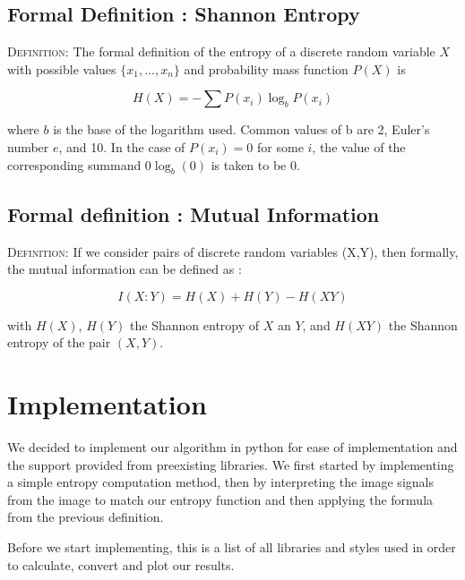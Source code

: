\documentclass{article}
\begin{document}
\subsection{Formal Definition : Shannon Entropy}
\vspace{2mm}
\begin{flushleft}
\vspace{2mm }
\begin{tcolorbox}
\textsc{Definition:}\cite{wiki-shannon}\newline\newline
The formal definition of the entropy of a discrete random variable $X$ with possible values $\{x_1, ... ,x_n\}$ and probability mass function $P(X)$ is
\vspace{4mm}
\begin{center}
\[
H(X) = - \sum{P(x_i)\log_b P(x_i)}
\]
\end{center}
\vspace{4mm}
where $b$ is the base of the logarithm used. Common values of b are 2, Euler's number $e$, and 10. In the case of $P(x_i) = 0$ for some $i$, the value of the corresponding summand $0\log_b (0)$ is taken to be 0.
\end{tcolorbox}
\end{flushleft}

\subsection{Formal definition : Mutual Information}
\vspace{2mm}
\begin{flushleft}
\vspace{2mm}
\begin{tcolorbox}
\textsc{Definition:}\cite{quantiki}\newline\newline
If we consider pairs of discrete random variables (X,Y), then formally, the mutual information can be defined as :
\begin{center}
\[
I(X : Y) = H(X) + H(Y) - H(XY)
\]
\end{center}
\vspace{2mm}
with $H(X)$, $H(Y)$ the Shannon entropy of $X$ an $Y$, and $H(XY)$ the Shannon entropy of the pair $(X, Y)$. 
\end{tcolorbox}
\end{flushleft}

\section{Implementation}
\vspace{2mm}
\begin{flushleft}
We decided to implement our algorithm in python for ease of implementation and the support provided from preexisting libraries. We first started by implementing a simple entropy computation method, then by interpreting the image signals from the image to match our entropy function and then applying the formula from the previous definition.

Before we start implementing, this is a list of all libraries and styles used in order to calculate, convert and plot our results.
\end{flushleft}
\end{document}
